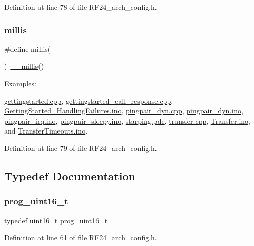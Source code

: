 Definition at line 78 of file R\+F24\+\_\+arch\+\_\+config.\+h.

\mbox{\label{group__Porting__General_gad5b3ec1ce839fa1c4337a7d0312e9749}} 
\subsubsection{\texorpdfstring{millis}{millis}}
{\footnotesize\ttfamily \#define millis(\begin{DoxyParamCaption}{ }\end{DoxyParamCaption})~\hyperlink{group__Porting__Timing_gad13c7acd564917af4f86b655035a6424}{\+\_\+\+\_\+millis}()}

\begin{Desc}
\item[Examples\+: ]\par
\hyperlink{gettingstarted_8cpp-example}{gettingstarted.\+cpp}, \hyperlink{gettingstarted_call_response_8cpp-example}{gettingstarted\+\_\+call\+\_\+response.\+cpp}, \hyperlink{GettingStarted_HandlingFailures_8ino-example}{Getting\+Started\+\_\+\+Handling\+Failures.\+ino}, \hyperlink{pingpair_dyn_8cpp-example}{pingpair\+\_\+dyn.\+cpp}, \hyperlink{pingpair_dyn_8ino-example}{pingpair\+\_\+dyn.\+ino}, \hyperlink{pingpair_irq_8ino-example}{pingpair\+\_\+irq.\+ino}, \hyperlink{pingpair_sleepy_8ino-example}{pingpair\+\_\+sleepy.\+ino}, \hyperlink{starping_8pde-example}{starping.\+pde}, \hyperlink{transfer_8cpp-example}{transfer.\+cpp}, \hyperlink{Transfer_8ino-example}{Transfer.\+ino}, and \hyperlink{TransferTimeouts_8ino-example}{Transfer\+Timeouts.\+ino}.\end{Desc}


Definition at line 79 of file R\+F24\+\_\+arch\+\_\+config.\+h.



\subsection{Typedef Documentation}
\mbox{\label{group__Porting__General_ga05ca2f20b55933ad782917161d54287d}} 
\subsubsection{\texorpdfstring{prog\+\_\+uint16\+\_\+t}{prog\_uint16\_t}}
{\footnotesize\ttfamily typedef uint16\+\_\+t \hyperlink{group__Porting__General_ga05ca2f20b55933ad782917161d54287d}{prog\+\_\+uint16\+\_\+t}}



Definition at line 61 of file R\+F24\+\_\+arch\+\_\+config.\+h.

